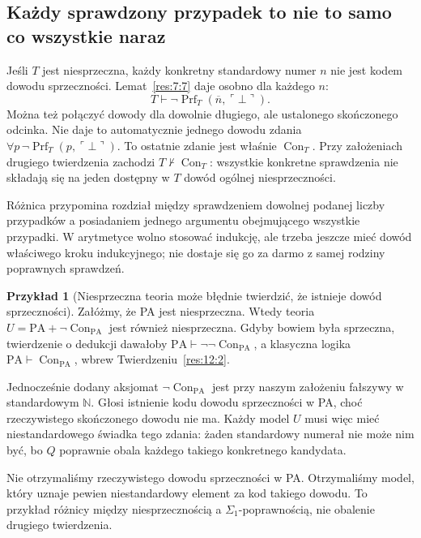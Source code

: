 \documentclass[11pt,a4paper]{article}
\numberwithin{equation}{section}
\theoremstyle{plain}
\theoremstyle{definition}
\newtheorem{przyklad}[twierdzenie]{Przykład}
\theoremstyle{remark}
\begin{document}
\subsection*{Każdy sprawdzony przypadek to nie to samo co wszystkie naraz}\label{sec:17:2}
Jeśli $T$ jest niesprzeczna, każdy konkretny standardowy numer $n$ nie jest kodem dowodu sprzeczności. Lemat~\ref{res:7:7} daje osobno dla każdego $n$:
\[
T\vdash\neg\operatorname{Prf}_T(\overline n,\ulcorner\bot\urcorner).
\]
Można też połączyć dowody dla dowolnie długiego, ale ustalonego skończonego odcinka. Nie daje to automatycznie jednego dowodu zdania $\forall p\,\neg\operatorname{Prf}_T(p,\ulcorner\bot\urcorner)$. To ostatnie zdanie jest właśnie $\operatorname{Con}_T$. Przy założeniach drugiego twierdzenia zachodzi $T\nvdash\operatorname{Con}_T$: wszystkie konkretne sprawdzenia nie składają się na jeden dostępny w $T$ dowód ogólnej niesprzeczności.

Różnica przypomina rozdział między sprawdzeniem dowolnej podanej liczby przypadków a posiadaniem jednego argumentu obejmującego wszystkie przypadki. W arytmetyce wolno stosować indukcję, ale trzeba jeszcze mieć dowód właściwego kroku indukcyjnego; nie dostaje się go za darmo z samej rodziny poprawnych sprawdzeń.

\begin{przyklad}[Niesprzeczna teoria może błędnie twierdzić, że istnieje dowód sprzeczności]\label{res:17:1}
Załóżmy, że PA jest niesprzeczna. Wtedy teoria $U=\mathrm{PA}+\neg\operatorname{Con}_{\mathrm{PA}}$ jest również niesprzeczna. Gdyby bowiem była sprzeczna, twierdzenie o dedukcji dawałoby $\mathrm{PA}\vdash\neg\neg\operatorname{Con}_{\mathrm{PA}}$, a klasyczna logika $\mathrm{PA}\vdash\operatorname{Con}_{\mathrm{PA}}$, wbrew Twierdzeniu~\ref{res:12:2}.

Jednocześnie dodany aksjomat $\neg\operatorname{Con}_{\mathrm{PA}}$ jest przy naszym założeniu fałszywy w standardowym $\mathbb N$. Głosi istnienie kodu dowodu sprzeczności w PA, choć rzeczywistego skończonego dowodu nie ma. Każdy model $U$ musi więc mieć niestandardowego świadka tego zdania: żaden standardowy numerał nie może nim być, bo $Q$ poprawnie obala każdego takiego konkretnego kandydata.

Nie otrzymaliśmy rzeczywistego dowodu sprzeczności w PA. Otrzymaliśmy model, który uznaje pewien niestandardowy element za kod takiego dowodu. To przykład różnicy między niesprzecznością a $\Sigma_1$-poprawnością, nie obalenie drugiego twierdzenia.
\end{przyklad}
\end{document}
